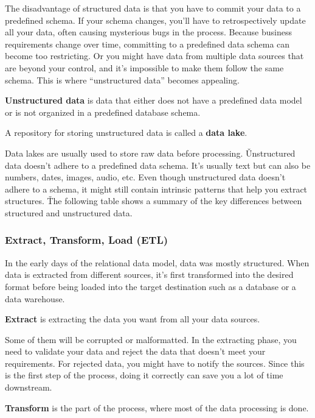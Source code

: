 The disadvantage of structured data is that you have to commit your data to a predefined schema. If your schema
changes, you'll have to retrospectively update all your data, often causing mysterious bugs in the process. Because
business requirements change over time, committing to a predefined data schema can become too restricting. Or you
might have data from multiple data sources that are beyond your control, and it's impossible to make them follow the
same schema. This is where ``unstructured data'' becomes appealing.

\textbf{Unstructured data} is data that either does not have a predefined data model or is not organized in a predefined
database schema.
\ed

A repository for storing unstructured data is called a \textbf{data lake}.
\ed

Data lakes are usually used to store raw data before processing. \v

Unstructured data doesn't adhere to a predefined data schema. It's usually text but can also be numbers, dates,
images, audio, etc. Even though unstructured data doesn't adhere to a schema, it might still contain intrinsic
patterns that help you extract structures. \v

The following table shows a summary of the key differences between structured and unstructured data.


\subsubsection{Extract, Transform, Load (ETL)}

In the early days of the relational data model, data was mostly structured. When data is extracted from different
sources, it's first transformed into the desired format before being loaded into the target destination such as a
database or a data warehouse.

\bd[Extract]
\textbf{Extract} is extracting the data you want from all your data sources.
\ed

Some of them will be corrupted or malformatted. In the extracting phase, you need to validate your data and reject
the data that doesn't meet your requirements. For rejected data, you might have to notify the sources. Since this is
the first step of the process, doing it correctly can save you a lot of time downstream.

\bd[Transform]
\textbf{Transform} is the part of the process, where most of the data processing is done.
\ed

